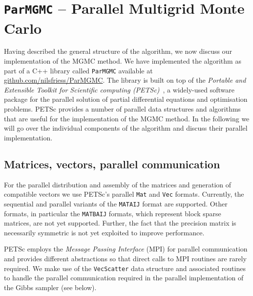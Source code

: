 \documentclass[
fontsize=11pt,
paper=a4,
numbers=noenddot
]{scrartcl}
\begin{document}
\section{\texttt{ParMGMC} -- Parallel Multigrid Monte Carlo}
Having described the general structure of the algorithm, we now discuss our implementation of the MGMC method. We have implemented the algorithm as part of a C++ library called \texttt{ParMGMC} available at \url{github.com/nilsfriess/ParMGMC}.
The library is built on top of the \emph{Portable and Extensible Toolkit for Scientific computing (PETSc)}~\cite{petsc-web-page,petsc-user-ref}, a widely-used software package for the parallel solution of partial differential equations and optimisation problems. PETSc provides a number of parallel data structures and algorithms that are useful for the implementation of the MGMC method. In the following we will go over the individual components of the algorithm and discuss their parallel implementation.

\subsection{Matrices, vectors, parallel communication}
For the parallel distribution and assembly of the matrices and generation of compatible vectors we use PETSc's parallel \texttt{Mat} and \texttt{Vec} formats. Currently, the sequential and parallel variants of the \texttt{MATAIJ} format are supported. Other formats, in particular the \texttt{MATBAIJ} formats, which represent block sparse matrices, are not yet supported. Further, the fact that the precision matrix is necessarily symmetric is not yet exploited to improve performance.

PETSc employs the \emph{Message Passing Interface} (MPI) for parallel communication and provides different abstractions so that direct calls to MPI routines are rarely required. We make use of the \texttt{VecScatter} data structure and associated routines to handle the parallel communication required in the parallel implementation of the Gibbs sampler (see below).
\end{document}
